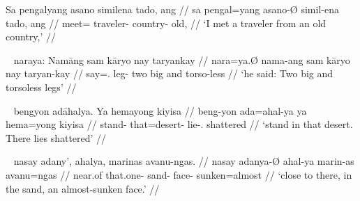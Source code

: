 
\ex\begingl
	\gla Sa pengalyang asano similena tado, ang //
	\glb sa pengal=yang asano-Ø simil-ena tado, ang //
	\glc \PatT{} meet=\Fsg{} traveler-\Top{} country-\Gen{} old, \AgtT{} //
	\glft `I met a traveler from an old country,' //
\endgl\xe

\ex~\begingl
	\gla naraya: Namāng sam kāryo nay taryankay //
	\glb nara=ya.Ø nama-ang sam kāryo nay taryan-kay //
	\glc say=\TsgM{}.\Top{} leg-\Aarg{} two big and torso-less //
	\glft `he said: Two big and torsoless legs' //
\endgl\xe

\ex~\begingl
	\gla bengyon adāhalya. Ya hemayong kiyisa //
	\glb beng-yon ada=ahal-ya ya hema=yong kiyisa //
	\glc stand-\TplN{} that=desert-\Loc{} \LocT{} lie-\TsgN{}.\Aarg{} 
		shattered //
	\glft `stand in that desert. There lies shattered' //
\endgl\xe

\ex~\begingl
	\gla nasay adany', ahalya, marinas avanu-ngas. //
	\glb nasay adanya-Ø ahal-ya marin-as avanu=ngas //
	\glc near.of that.one-\Top{} sand-\Loc{} face-\Parg{} sunken=almost //
	\glft `close to there, in the sand, an almost-sunken face.' //
\endgl

